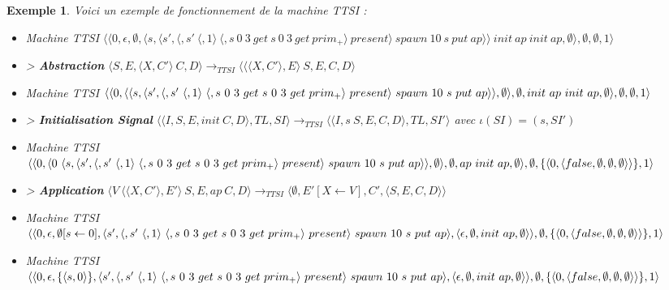 \documentclass[10pt,a4paper]{report}
\newtheorem{ex}{Exemple}
\begin{document}
	\begin{ex} \label{TTSI}	Voici un exemple de fonctionnement de la machine TTSI :
		\medbreak
		
		\begin{itemize}
			\item[] Machine TTSI $\langle\langle 0,\epsilon,\emptyset,\langle s,\langle s', \langle, s'~\langle,1\rangle~\langle,s~0~3~get~s~0~3~get~prim_{+}\rangle~present\rangle~spawn~10~s~put~ap\rangle\rangle~init~ap~init~ap,\emptyset\rangle,\emptyset,\emptyset,1\rangle$
			\item[] > \textbf{Abstraction} $\langle S,E,\langle X,C'\rangle~C,D\rangle
			\longrightarrow_{TTSI} 
			\langle \langle\langle X,C'\rangle,E\rangle~S,E,C,D\rangle$
			\item[] Machine TTSI $\langle\langle 0,\langle\langle s,\langle s', \langle, s'~\langle,1\rangle~\langle,s~0~3~get~s~0~3~get~prim_{+}\rangle~present\rangle~spawn~10~s~put~ap\rangle\rangle,\emptyset \rangle,\emptyset,init~ap~init~ap,\emptyset\rangle,\\\emptyset,\emptyset,1\rangle$
			\item[] > \textbf{Initialisation Signal} $\langle\langle I,S,E,init~C,D\rangle,TL,SI\rangle 
			\longrightarrow_{TTSI}
			\langle\langle I,s~S,E,C,D\rangle,TL,SI'\rangle$
			avec $\iota(SI) = (s,SI')$
			\item[] Machine TTSI $\langle\langle 0,\langle 0~\langle s,\langle s', \langle, s'~\langle,1\rangle~\langle,s~0~3~get~s~0~3~get~prim_{+}\rangle~present\rangle~spawn~10~s~put~ap\rangle\rangle,\emptyset \rangle,\emptyset,ap~init~ap,\emptyset\rangle,\\\emptyset,\{\langle 0,\langle false,\emptyset,\emptyset,\emptyset\rangle\rangle\},1\rangle$
			\item[] > \textbf{Application} $\langle V~\langle\langle X,C'\rangle,E'\rangle~S,E,ap~C,D\rangle
			\longrightarrow_{TTSI} 
			\langle \emptyset,E'[X \leftarrow V],C',\langle S,E,C,D\rangle\rangle$
			\item[] Machine TTSI $\langle\langle 0,\epsilon,\emptyset[s \leftarrow 0],\langle s', \langle, s'~\langle,1\rangle~\langle,s~0~3~get~s~0~3~get~prim_{+}\rangle~present\rangle~spawn~10~s~put~ap\rangle,\langle\epsilon,\emptyset,init~ap,\emptyset\rangle\rangle,\\\emptyset,\{\langle 0,\langle false,\emptyset,\emptyset,\emptyset\rangle\rangle\},1\rangle$
			\item[] Machine TTSI $\langle\langle 0,\epsilon,\{\langle s,0\rangle\},\langle s', \langle, s'~\langle,1\rangle~\langle,s~0~3~get~s~0~3~get~prim_{+}\rangle~present\rangle~spawn~10~s~put~ap\rangle,\langle\epsilon,\emptyset,init~ap,\emptyset\rangle\rangle,\\\emptyset,\{\langle 0,\langle false,\emptyset,\emptyset,\emptyset\rangle\rangle\},1\rangle$

\end{itemize}
\end{ex}
\end{document}
